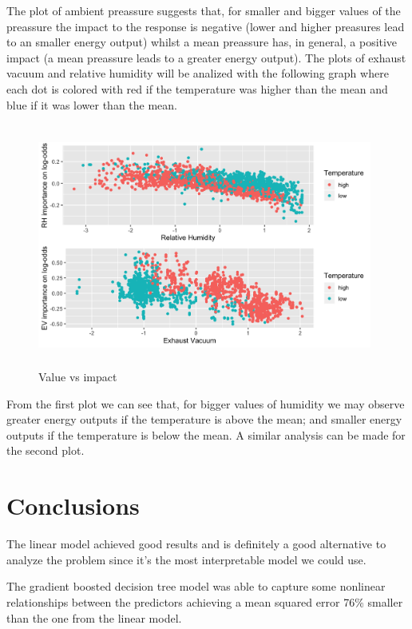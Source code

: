 The plot of ambient preassure suggests that, for smaller and bigger values of the preassure the impact to the response is negative (lower and higher preasures lead to an smaller energy output) whilst a mean preassure has, in general, a positive impact (a mean preassure leads to a greater energy output).
\newpage
The plots of exhaust vacuum and relative humidity will be analized with the following graph where each dot is colored with red if the temperature was higher than the mean and blue if it was lower than the
mean.
\begin{figure}[H]
    \begin{center}
        \includegraphics[width=11cm, height=8cm]{img/expl_2}
        \caption{Value vs impact}
    \end{center}
\end{figure}

From the first plot we can see that, for bigger values of humidity we may observe greater energy outputs if the temperature is above the mean; and smaller energy outputs if the temperature is below the mean. A similar analysis can be made for the second plot.

\section{Conclusions}

The linear model achieved good results and is definitely a good alternative to analyze the problem since it's the most interpretable model we could use.

The gradient boosted decision tree model was able to capture some nonlinear relationships between the predictors achieving a mean squared error 76\% smaller than the one from the linear model.

